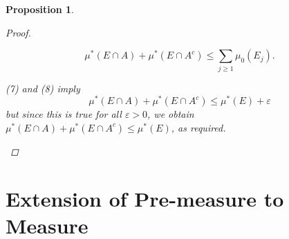 \documentclass{article}
\theoremstyle{spaced}
\newtheorem{proposition}[theorem]{Proposition}
\begin{document}
\begin{proposition}
\begin{proof}
\begin{enumerate}
            \begin{equation}
                \mu^*(E \cap A) + \mu^*(E \cap A^c) \leq \sum_{j \geq 1} \mu_0(E_j).
            \end{equation}

            (7) and (8) imply
            \begin{equation*}
                \mu^*(E \cap A) + \mu^*(E \cap A^c) \leq \mu^*(E) + \varepsilon
            \end{equation*}
            but since this is true for all $\varepsilon > 0$, we obtain $ \mu^*(E \cap A) + \mu^*(E \cap A^c) \leq \mu^*(E) $, as required. 
        \end{enumerate}
    \end{proof}
\end{proposition}

\section{Extension of Pre-measure to Measure}
\end{document}
